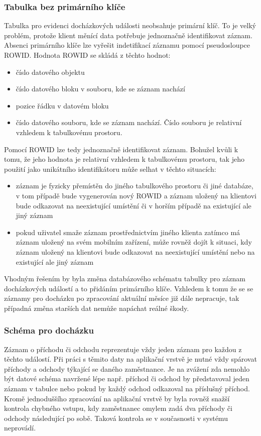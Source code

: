 \documentclass{diplomka}
\begin{document}
\subsubsection*{Tabulka bez primárního klíče}
Tabulka pro evidenci docházkových události neobsahuje primární klíč. To je velký problém, protože klient měnící data potřebuje jednoznačně identifikovat záznam. Absenci primárního klíče lze vyřešit indetifikací záznamu pomocí pseudosloupce ROWID. Hodnota ROWID se skládá z těchto hodnot:
\begin{itemize}[noitemsep,nolistsep]
\item číslo datového objektu 
\item číslo datového bloku v souboru, kde se záznam nachází
\item pozice řádku v datovém bloku 
\item číslo datového souboru, kde se záznam nachází. Číslo souboru je relativní vzhledem k tabulkovému prostoru.
\end{itemize}
Pomocí ROWID lze tedy jednoznačně identifikovat záznam. Bohužel kvůli k tomu, že jeho hodnota je relativní vzhledem k tabulkovému prostoru, tak jeho použití jako unikátního identifikátoru může selhat v těchto situacích:
\begin{itemize}[noitemsep,nolistsep]
\item záznam je fyzicky přemístěn do jiného tabulkového prostoru či jiné databáze, v tom případě bude vygenerován nový ROWID a záznam uložený na klientovi bude odkazovat na neexistující umístění či v horším případě na existující ale jiný záznam
\item pokud uživatel smaže záznam prostřednictvím jiného klienta zatímco má záznam uložený na svém mobilním zařízení, může rovněž dojít k situaci, kdy záznam uložený na klientovi bude odkazovat na neexistující umístění nebo na existující ale jiný záznam 
\end{itemize}

Vhodným řešením by byla změna databázového schématu tabulky pro záznam docházkových událostí a to přidáním primárního klíče. Vzhledem k tomu že se se záznamy pro docházku po zpracování aktuální měsíce již dále nepracuje, tak případná změna starších dat nemůže napáchat reálné škody. 
\subsubsection*{Schéma pro docházku}
Záznam o příchodu či odchodu reprezentuje vždy jeden záznam pro každou z těchto událostí. Při práci s těmito daty na aplikační vrstvě je nutné vždy spárovat příchody a odchody týkající se daného zaměstnance. Je na zvážení zda nemohlo být datové schéma navržené lépe např. příchod či odchod by představoval jeden záznam v tabulce nebo pokud by každý odchod odkazoval na příslušný příchod. Kromě jednoduššího zpracování na aplikační vrstvě by byla rovněž snažší kontrola chybného vstupu, kdy zaměstnanec omylem zadá dva příchody či odchody následující po sobě. Taková kontrola se v současnosti v systému neprovádí.
\end{document}
